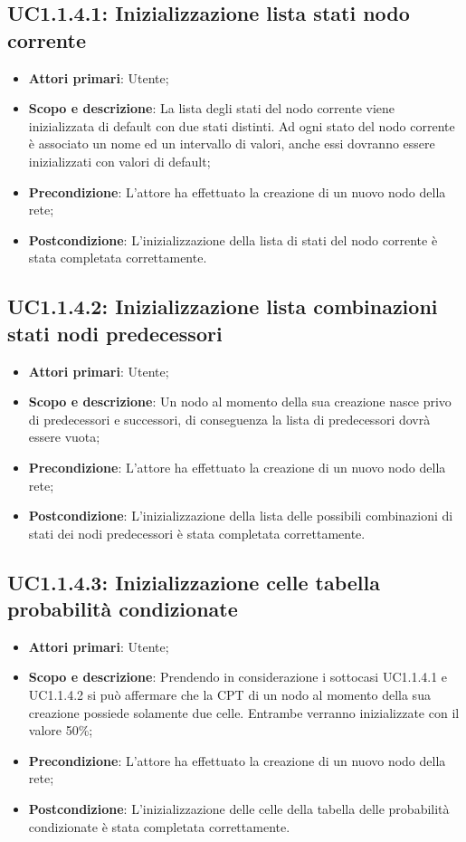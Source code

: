 \subsection{UC1.1.4.1: Inizializzazione lista stati nodo corrente} 
\hypertarget{UC1.1.4.1}{} 
\begin{itemize} 
	\item{\textbf{Attori primari}: Utente;} 
	\item{\textbf{Scopo e descrizione}: La lista degli stati del nodo corrente viene inizializzata di default con due stati distinti. Ad ogni stato del nodo corrente è associato un nome ed un intervallo di valori, anche essi dovranno essere inizializzati con valori di default;} 
	\item{\textbf{Precondizione}: L'attore ha effettuato la creazione di un nuovo nodo della rete;} 
	\item{\textbf{Postcondizione}: L'inizializzazione della lista di stati del nodo corrente è stata completata correttamente.} 
\end{itemize} 
\subsection{UC1.1.4.2: Inizializzazione lista combinazioni stati nodi predecessori} 
\hypertarget{UC1.1.4.2}{} 
\begin{itemize} 
	\item{\textbf{Attori primari}: Utente;} 
	\item{\textbf{Scopo e descrizione}: Un nodo al momento della sua creazione nasce privo di predecessori e successori, di conseguenza la lista di predecessori dovrà essere vuota;} 
	\item{\textbf{Precondizione}: L'attore ha effettuato la creazione di un nuovo nodo della rete;} 
	\item{\textbf{Postcondizione}: L'inizializzazione della lista delle possibili combinazioni di stati dei nodi predecessori è stata completata correttamente.} 
\end{itemize} 
\subsection{UC1.1.4.3: Inizializzazione celle tabella probabilità condizionate} 
\hypertarget{UC1.1.4.3}{} 
\begin{itemize} 
	\item{\textbf{Attori primari}: Utente;} 
	\item{\textbf{Scopo e descrizione}: Prendendo in considerazione i sottocasi UC1.1.4.1 e UC1.1.4.2 si può affermare che la CPT di un nodo al momento della sua creazione possiede solamente due celle. Entrambe verranno inizializzate con il valore 50\%;} 
	\item{\textbf{Precondizione}: L'attore ha effettuato la creazione di un nuovo nodo della rete;} 
	\item{\textbf{Postcondizione}: L'inizializzazione delle celle della tabella delle probabilità condizionate è stata completata correttamente.} 
\end{itemize} 
